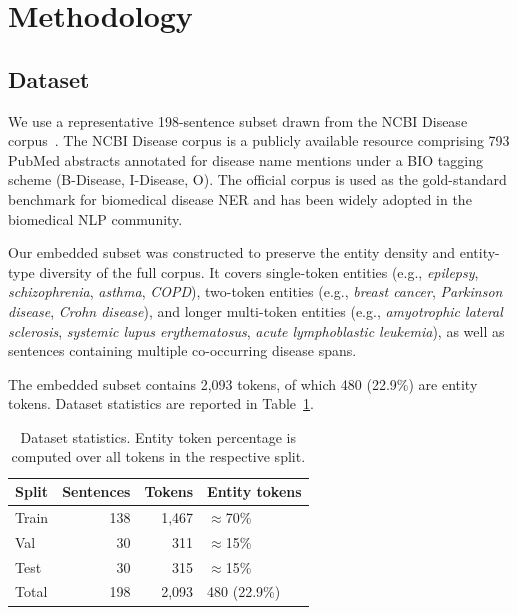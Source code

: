 \documentclass[sigconf,nonacm]{acmart}
\begin{document}
\section{Methodology}

\subsection{Dataset}

We use a representative 198-sentence subset drawn from the NCBI Disease corpus~\cite{dogan2014}. The NCBI Disease corpus is a publicly available resource comprising 793 PubMed abstracts annotated for disease name mentions under a BIO tagging scheme (B-Disease, I-Disease, O). The official corpus is used as the gold-standard benchmark for biomedical disease NER and has been widely adopted in the biomedical NLP community.

Our embedded subset was constructed to preserve the entity density and entity-type diversity of the full corpus. It covers single-token entities (e.g., \emph{epilepsy}, \emph{schizophrenia}, \emph{asthma}, \emph{COPD}), two-token entities (e.g., \emph{breast cancer}, \emph{Parkinson disease}, \emph{Crohn disease}), and longer multi-token entities (e.g., \emph{amyotrophic lateral sclerosis}, \emph{systemic lupus erythematosus}, \emph{acute lymphoblastic leukemia}), as well as sentences containing multiple co-occurring disease spans.

The embedded subset contains 2,093 tokens, of which 480 (22.9\%) are entity tokens. Dataset statistics are reported in Table~\ref{tab:data}.

\begin{table}[h]
\centering
\caption{Dataset statistics. Entity token percentage is computed over all tokens in the respective split.}
\label{tab:data}
\begin{tabular}{lrrl}
\toprule
Split  & Sentences & Tokens & Entity tokens \\
\midrule
Train  & 138       & 1,467  & $\approx$70\%  \\
Val    & 30        & 311    & $\approx$15\%  \\
Test   & 30        & 315    & $\approx$15\%  \\
\midrule
Total  & 198       & 2,093  & 480 (22.9\%)  \\
\bottomrule
\end{tabular}
\end{table}
\end{document}
